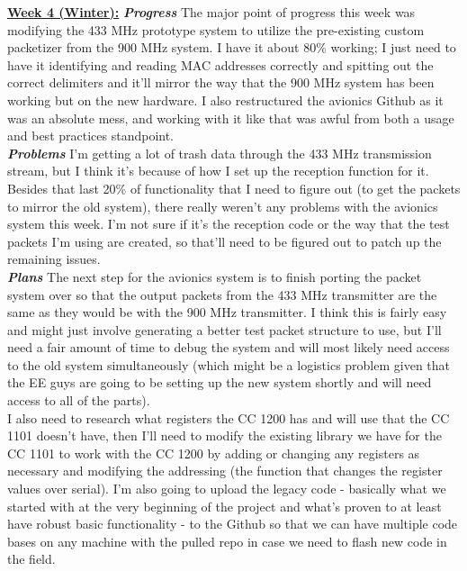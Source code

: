 \documentclass[onecolumn, draftclsnofoot, 10pt, compsoc]{IEEEtran}
\begin{document}
\underline{\textbf{Week 4 (Winter):}}
\newline\textbf{\textit{{Progress}}}
\newline The major point of progress this week was modifying the 433 MHz prototype system to utilize the pre-existing custom packetizer from the 900 MHz system. I have it about 80\% working; I just need to have it identifying and reading MAC addresses correctly and spitting out the correct delimiters and it'll mirror the way that the 900 MHz system has been working but on the new hardware. I also restructured the avionics Github as it was an absolute mess, and working with it like that was awful from both a usage and best practices standpoint. \\

\textbf{\textit{{Problems}}}
\newline I'm getting a lot of trash data through the 433 MHz transmission stream, but I think it's because of how I set up the reception function for it. Besides that last 20\% of functionality that I need to figure out (to get the packets to mirror the old system), there really weren't any problems with the avionics system this week. I'm not sure if it's the reception code or the way that the test packets I'm using are created, so that'll need to be figured out to patch up the remaining issues. \\

\textbf{\textit{{Plans}}}
\newline The next step for the avionics system is to finish porting the packet system over so that the output packets from the 433 MHz transmitter are the same as they would be with the 900 MHz transmitter. I think this is fairly easy and might just involve generating a better test packet structure to use, but I'll need a fair amount of time to debug the system and will most likely need access to the old system simultaneously (which might be a logistics problem given that the EE guys are going to be setting up the new system shortly and will need access to all of the parts). \\

I also need to research what registers the CC 1200 has and will use that the CC 1101 doesn't have, then I'll need to modify the existing library we have for the CC 1101 to work with the CC 1200 by adding or changing any registers as necessary and modifying the addressing (the function that changes the register values over serial). I'm also going to upload the legacy code - basically what we started with at the very beginning of the project and what's proven to at least have robust basic functionality - to the Github so that we can have multiple code bases on any machine with the pulled repo in case we need to flash new code in the field. \\
\end{document}
